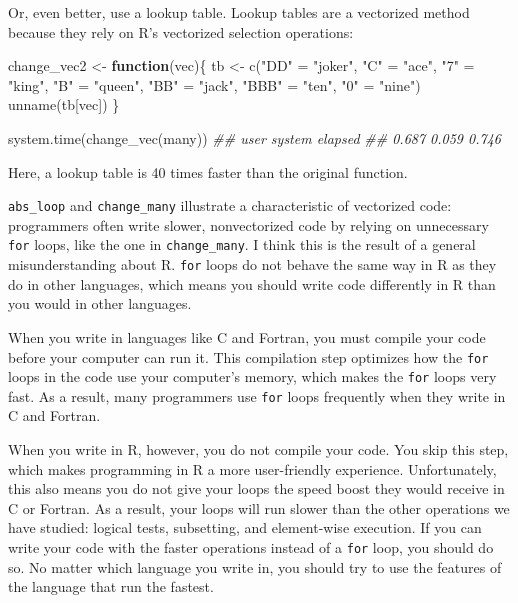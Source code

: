 \documentclass[
  letterpaper,
  DIV=11,
  numbers=noendperiod]{scrbook}
\newenvironment{Shaded}{\begin{snugshade}}{\end{snugshade}}
\newcommand{\ControlFlowTok}[1]{\textcolor[rgb]{0.00,0.23,0.31}{\textbf{#1}}}
\newcommand{\DocumentationTok}[1]{\textcolor[rgb]{0.37,0.37,0.37}{\textit{#1}}}
\newcommand{\FunctionTok}[1]{\textcolor[rgb]{0.28,0.35,0.67}{#1}}
\newcommand{\NormalTok}[1]{\textcolor[rgb]{0.00,0.23,0.31}{#1}}
\newcommand{\OtherTok}[1]{\textcolor[rgb]{0.00,0.23,0.31}{#1}}
\newcommand{\StringTok}[1]{\textcolor[rgb]{0.13,0.47,0.30}{#1}}
\begin{document}
Or, even better, use a lookup table. Lookup tables are a vectorized
method because they rely on R's vectorized selection operations:

\begin{Shaded}
\begin{Highlighting}[]
\NormalTok{change\_vec2 }\OtherTok{\textless{}{-}} \ControlFlowTok{function}\NormalTok{(vec)\{}
\NormalTok{  tb }\OtherTok{\textless{}{-}} \FunctionTok{c}\NormalTok{(}\StringTok{"DD"} \OtherTok{=} \StringTok{"joker"}\NormalTok{, }\StringTok{"C"} \OtherTok{=} \StringTok{"ace"}\NormalTok{, }\StringTok{"7"} \OtherTok{=} \StringTok{"king"}\NormalTok{, }\StringTok{"B"} \OtherTok{=} \StringTok{"queen"}\NormalTok{, }
    \StringTok{"BB"} \OtherTok{=} \StringTok{"jack"}\NormalTok{, }\StringTok{"BBB"} \OtherTok{=} \StringTok{"ten"}\NormalTok{, }\StringTok{"0"} \OtherTok{=} \StringTok{"nine"}\NormalTok{)}
  \FunctionTok{unname}\NormalTok{(tb[vec])}
\NormalTok{\}}

\FunctionTok{system.time}\NormalTok{(}\FunctionTok{change\_vec}\NormalTok{(many))}
\DocumentationTok{\#\#   user  system elapsed }
\DocumentationTok{\#\#  0.687   0.059   0.746 }
\end{Highlighting}
\end{Shaded}

Here, a lookup table is 40 times faster than the original function.

\texttt{abs\_loop} and \texttt{change\_many} illustrate a characteristic
of vectorized code: programmers often write slower, nonvectorized code
by relying on unnecessary \texttt{for} loops, like the one in
\texttt{change\_many}. I think this is the result of a general
misunderstanding about R. \texttt{for} loops do not behave the same way
in R as they do in other languages, which means you should write code
differently in R than you would in other languages.

When you write in languages like C and Fortran, you must compile your
code before your computer can run it. This compilation step optimizes
how the \texttt{for} loops in the code use your computer's memory, which
makes the \texttt{for} loops very fast. As a result, many programmers
use \texttt{for} loops frequently when they write in C and Fortran.

When you write in R, however, you do not compile your code. You skip
this step, which makes programming in R a more user-friendly experience.
Unfortunately, this also means you do not give your loops the speed
boost they would receive in C or Fortran. As a result, your loops will
run slower than the other operations we have studied: logical tests,
subsetting, and element-wise execution. If you can write your code with
the faster operations instead of a \texttt{for} loop, you should do so.
No matter which language you write in, you should try to use the
features of the language that run the fastest.
\end{document}
